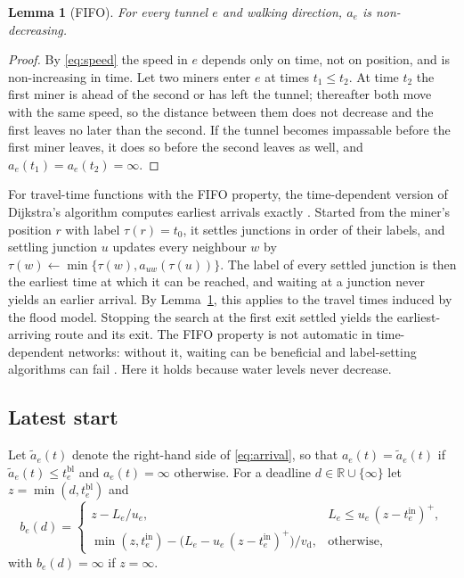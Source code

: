 \documentclass[11pt,a4paper]{article}
\theoremstyle{plain}
\newtheorem{lemma}{Lemma}
\theoremstyle{definition}
\theoremstyle{remark}
\newcommand{\tin}{t^{\mathrm{in}}}
\newcommand{\tbl}{t^{\mathrm{bl}}}
\newcommand{\vd}{v_{\mathrm{d}}}
\begin{document}
\begin{lemma}[FIFO]\label{lem:fifo}
For every tunnel $e$ and walking direction, $a_e$ is non-decreasing.
\end{lemma}
\begin{proof}
By \eqref{eq:speed} the speed in $e$ depends only on time, not on position, and is non-increasing in time. Let two miners enter $e$ at times $t_1 \le t_2$. At time $t_2$ the first miner is ahead of the second or has left the tunnel; thereafter both move with the same speed, so the distance between them does not decrease and the first leaves no later than the second. If the tunnel becomes impassable before the first miner leaves, it does so before the second leaves as well, and $a_e(t_1) = a_e(t_2) = \infty$.
\end{proof}

For travel-time functions with the FIFO property, the time-dependent version of Dijkstra's algorithm \cite{dijkstra} computes earliest arrivals exactly \cite{dreyfus, kaufman}. Started from the miner's position $r$ with label $\tau(r) = t_0$, it settles junctions in order of their labels, and settling junction $u$ updates every neighbour $w$ by $\tau(w) \gets \min\{\tau(w), a_{uw}(\tau(u))\}$. The label of every settled junction is then the earliest time at which it can be reached, and waiting at a junction never yields an earlier arrival. By Lemma~\ref{lem:fifo}, this applies to the travel times induced by the flood model. Stopping the search at the first exit settled yields the earliest-arriving route and its exit. The FIFO property is not automatic in time-dependent networks: without it, waiting can be beneficial and label-setting algorithms can fail \cite{orda}. Here it holds because water levels never decrease.

\subsection{Latest start}\label{sec:latest}
Let $\tilde a_e(t)$ denote the right-hand side of \eqref{eq:arrival}, so that $a_e(t) = \tilde a_e(t)$ if $\tilde a_e(t) \le \tbl_e$ and $a_e(t) = \infty$ otherwise. For a deadline $d \in \mathbb{R} \cup \{\infty\}$ let $z = \min(d, \tbl_e)$ and
\begin{equation}
  b_e(d) = \begin{cases}
    z - L_e/u_e, & L_e \le u_e\,(z - \tin_e)^+,\\[2pt]
    \min(z, \tin_e) - \bigl(L_e - u_e\,(z - \tin_e)^+\bigr)/\vd, & \text{otherwise},
  \end{cases}
  \label{eq:latest}
\end{equation}
with $b_e(d) = \infty$ if $z = \infty$.
\end{document}
